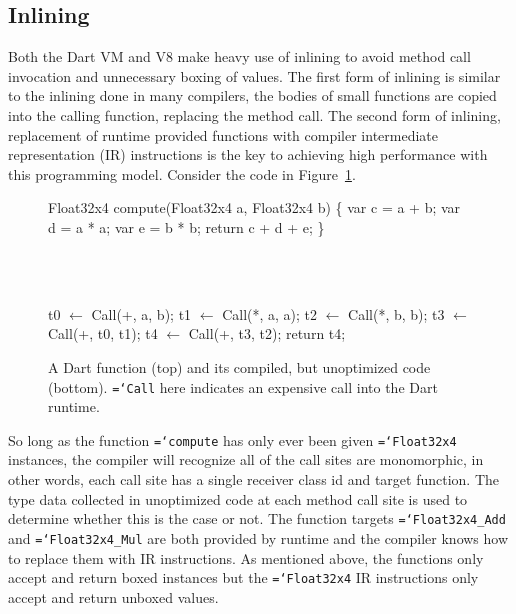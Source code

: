 \documentclass[preprint]{sigplanconf}
\newcommand{\ttt}[1]{{\texttt{\hyphenchar\font=`\-\relax #1}}}%
\begin{document}
\subsection{Inlining}
\label{inlining}

Both the Dart VM and V8 make heavy use of inlining to avoid method call
invocation and unnecessary boxing of values. The first form of inlining is
similar to the inlining done in many compilers, the bodies of small functions
are copied into the calling function, replacing the method call. The second form
of inlining, replacement of runtime provided functions with compiler
intermediate representation (IR) instructions is the key to achieving high
performance with this programming model. Consider the code in
Figure~\ref{fig:unoptimized}.

\begin{figure}
\begin{small}
\begin{program}[style=tt, number=true]
Fl\tab{}oat32x4 compute(Float32x4 a, Float32x4 b) \{
  var c = a + b;
  var d = a * a;
  var e = b *  b;
  return c + d + e;\untab{}
\}
\end{program}
\end{small}
\ \ \\ \ \ \\
\begin{small}
\begin{program}[style=tt, number=true]
t0 $\leftarrow$ Call(+, a, b);
t1 $\leftarrow$ Call(*, a, a);
t2 $\leftarrow$ Call(*, b, b);
t3 $\leftarrow$ Call(+, t0, t1);
t4 $\leftarrow$ Call(+, t3, t2);
return t4;
\end{program}
\end{small}
\caption{A Dart function (top) and its compiled, but unoptimized code
(bottom). \ttt{Call} here indicates an expensive call into the Dart runtime.}
\label{fig:unoptimized}
\end{figure}

So long as the function \ttt{compute} has only ever been given \ttt{Float32x4}
instances, the compiler will recognize all of the call sites are monomorphic, in
other words, each call site has a single receiver class id and target function.
The type data collected in unoptimized code at each method call site is used to
determine whether this is the case or not. The function targets
\ttt{Float32x4\_Add} and \ttt{Float32x4\_Mul} are both provided by runtime and
the compiler knows how to replace them with IR instructions. As mentioned above,
the functions only accept and return boxed instances but the \ttt{Float32x4} IR
instructions only accept and return unboxed values.
\end{document}

